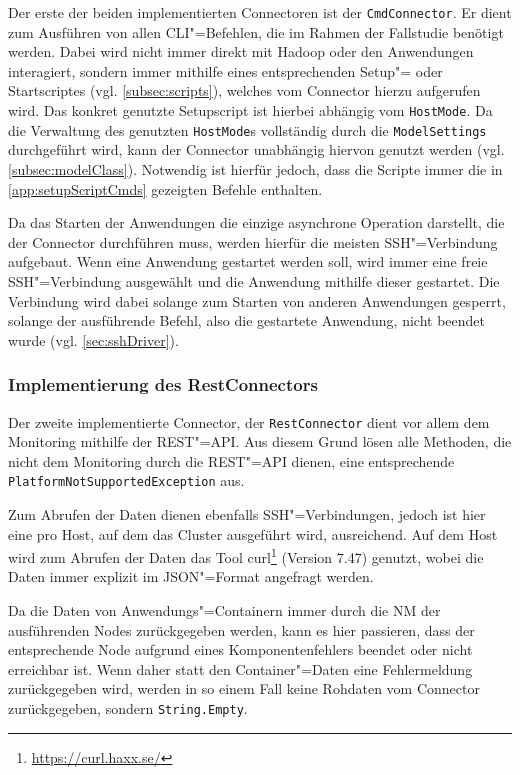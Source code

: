 Der erste der beiden implementierten Connectoren ist der \texttt{CmdConnector}.
Er dient zum Ausführen von allen CLI"=Befehlen, die im Rahmen der Fallstudie benötigt werden.
Dabei wird nicht immer direkt mit Hadoop oder den Anwendungen interagiert, sondern immer mithilfe eines entsprechenden Setup"= oder Startscriptes (vgl. \cref{subsec:scripts}), welches vom Connector hierzu aufgerufen wird.
Das konkret genutzte Setupscript ist hierbei abhängig vom \texttt{HostMode}.
Da die Verwaltung des genutzten \texttt{HostMode}s vollständig durch die \texttt{ModelSettings} durchgeführt wird, kann der Connector unabhängig hiervon genutzt werden (vgl. \cref{subsec:modelClass}).
Notwendig ist hierfür jedoch, dass die Scripte immer die in \cref{app:setupScriptCmds} gezeigten Befehle enthalten.

Da das Starten der Anwendungen die einzige asynchrone Operation darstellt, die der Connector durchführen muss, werden hierfür die meisten SSH"=Verbindung aufgebaut.
Wenn eine Anwendung gestartet werden soll, wird immer eine freie SSH"=Verbindung ausgewählt und die Anwendung mithilfe dieser gestartet.
Die Verbindung wird dabei solange zum Starten von anderen Anwendungen gesperrt, solange der ausführende Befehl, also die gestartete Anwendung, nicht beendet wurde (vgl. \cref{sec:sshDriver}).

\subsubsection{Implementierung des RestConnectors}
\label{subsubsec:implRestConnector}

Der zweite implementierte Connector, der \texttt{RestConnector} dient vor allem dem Monitoring mithilfe der REST"=API.
Aus diesem Grund lösen alle Methoden, die nicht dem Monitoring durch die REST"=API dienen, eine entsprechende \texttt{PlatformNotSupportedException} aus.

Zum Abrufen der Daten dienen ebenfalls SSH"=Verbindungen, jedoch ist hier eine pro Host, auf dem das Cluster ausgeführt wird, ausreichend.
Auf dem Host wird zum Abrufen der Daten das Tool curl\footnote{\url{https://curl.haxx.se/}} (Version 7.47) genutzt, wobei die Daten immer explizit im JSON"=Format angefragt werden.

Da die Daten von Anwendungs"=Containern immer durch die \ac{NM} der ausführenden Nodes zurückgegeben werden, kann es hier passieren, dass der entsprechende Node aufgrund eines Komponentenfehlers beendet oder nicht erreichbar ist.
Wenn daher statt den Container"=Daten eine Fehlermeldung zurückgegeben wird, werden in so einem Fall keine Rohdaten vom Connector zurückgegeben, sondern \texttt{String.Empty}.

